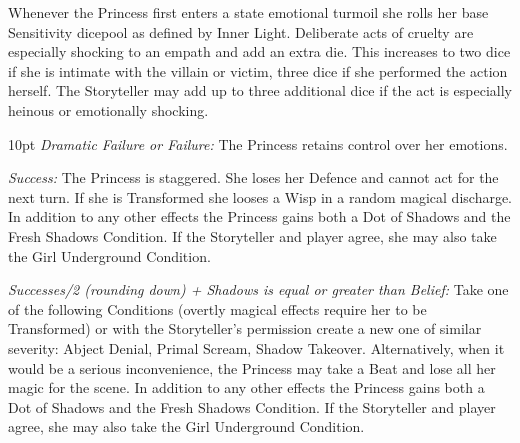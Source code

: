 Whenever the Princess first enters a state emotional turmoil she rolls her base Sensitivity dicepool as defined by Inner Light. Deliberate acts of cruelty are especially shocking to an empath and add an extra die. This increases to two dice if she is intimate with the villain or victim, three dice if she performed the action herself. The Storyteller may add up to three additional dice if the act is especially heinous or emotionally shocking. 

\begin{myindentpar}{10pt}    \emph{Dramatic Failure or Failure:} The Princess retains control over her emotions.

\emph{Success:} The Princess is staggered. She loses her Defence and cannot act for the next turn. If she is Transformed she looses a Wisp in a random magical discharge. In addition to any other effects the Princess gains both a Dot of Shadows and the Fresh Shadows Condition. If the Storyteller and player agree, she may also take the Girl Underground Condition. 

\emph{Successes/2 (rounding down) + Shadows is equal or greater than Belief:} Take one of the following Conditions (overtly magical effects require her to be Transformed) or with the Storyteller's permission create a new one of similar severity: Abject Denial, Primal Scream, Shadow Takeover. Alternatively, when it would be a serious inconvenience, the Princess may take a Beat and lose all her magic for the scene. In addition to any other effects the Princess gains both a Dot of Shadows and the Fresh Shadows Condition. If the Storyteller and player agree, she may also take the Girl Underground Condition. 

\end{myindentpar}

